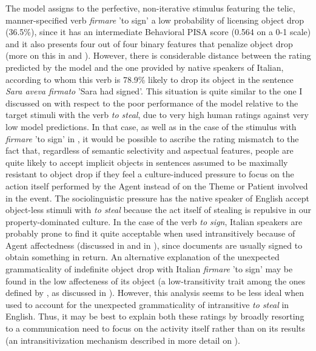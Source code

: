 The model assigns to the perfective, non-iterative stimulus featuring the telic, manner-specified verb \textit{firmare} 'to sign' a low probability of licensing object drop (36.5\%), since it has an intermediate Behavioral PISA score (0.564 on a 0-1 scale) and it also presents four out of four binary features that penalize object drop (more on this in  and ). However, there is considerable distance between the rating predicted by the model and the one provided by native speakers of Italian, according to whom this verb is 78.9\% likely to drop its object in the sentence \textit{Sara aveva firmato} 'Sara had signed'. This situation is quite similar to the one I discussed on  with respect to the poor performance of the model relative to the target stimuli with the verb \textit{to steal}, due to very high human ratings against very low model predictions. In that case, as well as in the case of the stimulus with \textit{firmare} 'to sign' in , it would be possible to ascribe the rating mismatch to the fact that, regardless of semantic selectivity and aspectual features, people are quite likely to accept implicit objects in sentences assumed to be maximally resistant to object drop if they feel a culture-induced pressure to focus on the action itself performed by the Agent instead of on the Theme or Patient involved in the event. The sociolinguistic pressure has the native speaker of English accept object-less stimuli with \textit{to steal} because the act itself of stealing is repulsive in our property-dominated culture. In the case of the verb \textit{to sign}, Italian speakers are probably prone to find it quite acceptable when used intransitively because of Agent affectedness (discussed in  and in ), since documents are usually signed to obtain something in return. An alternative explanation of the unexpected grammaticality of indefinite object drop with Italian \textit{firmare} 'to sign' may be found in the low affecteness of its object (a low-transitivity trait among the ones defined by \textcite{HopperThompson1980}, as discussed in ). However, this analysis seems to be less ideal when used to account for the unexpected grammaticality of intransitive \textit{to steal} in English. Thus, it may be best to explain both these ratings by broadly resorting to a communication need to focus on the activity itself rather than on its results (an intransitivization mechanism described in more detail on ). \\ %